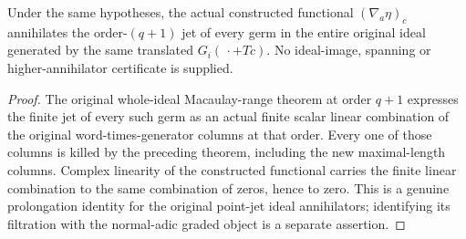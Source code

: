 \begin{theorem}
\label{hir:actual-dual-jet-prolongation-whole-original-ideal-zero}
\leanok
Under the same hypotheses, the actual constructed functional
$(\nabla_a\eta)_c$ annihilates the order-$(q+1)$ jet of every germ
in the entire original ideal generated by the same translated
$G_i(\,\cdot+Tc)$. No ideal-image, spanning or higher-annihilator
certificate is supplied.
\end{theorem}
\begin{proof}
The original whole-ideal Macaulay-range theorem at order $q+1$
expresses the finite jet of every such germ as an actual finite scalar
linear combination of the original word-times-generator columns at
that order. Every one of those columns is killed by the preceding
theorem, including the new maximal-length columns. Complex linearity
of the constructed functional carries the finite linear combination
to the same combination of zeros, hence to zero. This is a genuine
prolongation identity for the original point-jet ideal annihilators;
identifying its filtration with the normal-adic graded object is a
separate assertion.
\end{proof}
